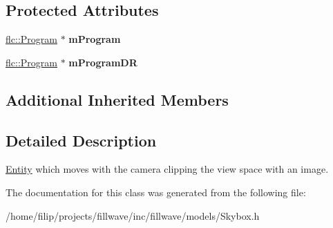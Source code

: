 \subsection*{Protected Attributes}
\begin{DoxyCompactItemize}
\item 
\mbox{\label{classflw_1_1flf_1_1Skybox_affba7dea849a2e53cb3a13ed96f677e7}} 
\hyperlink{classflw_1_1flc_1_1Program}{flc\+::\+Program} $\ast$ {\bfseries m\+Program}
\item 
\mbox{\label{classflw_1_1flf_1_1Skybox_a9b11959f2cbbcbadf92ee09acf185b06}} 
\hyperlink{classflw_1_1flc_1_1Program}{flc\+::\+Program} $\ast$ {\bfseries m\+Program\+DR}
\end{DoxyCompactItemize}
\subsection*{Additional Inherited Members}


\subsection{Detailed Description}
\hyperlink{classflw_1_1flf_1_1Entity}{Entity} which moves with the camera clipping the view space with an image. 

The documentation for this class was generated from the following file\+:\begin{DoxyCompactItemize}
\item 
/home/filip/projects/fillwave/inc/fillwave/models/Skybox.\+h\end{DoxyCompactItemize}
